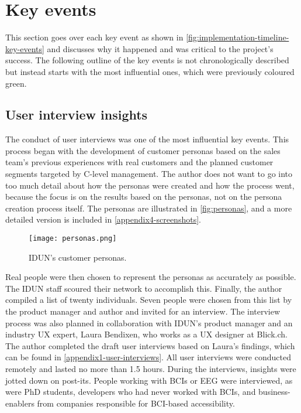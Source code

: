 \section{Key events}
\label{chapter4-key-events}

This section goes over each key event as shown in \autoref{fig:implementation-timeline-key-events} and discusses why it happened and was critical to the project's success. The following outline of the key events is not chronologically described but instead starts with the most influential ones, which were previously coloured green.

\subsection{User interview insights}
\label{chapter4-user-interview-insights}

The conduct of user interviews was one of the most influential key events. This process began with the development of customer personas based on the sales team's previous experiences with real customers and the planned customer segments targeted by C-level management. The author does not want to go into too much detail about how the personas were created and how the process went, because the focus is on the results based on the personas, not on the persona creation process itself. The personas are illustrated in \autoref{fig:personas}, and a more detailed version is included in \autoref{appendix4-screenshots}.

\begin{figure}[!ht]
  \centering
  \texttt{[image: personas.png]}
  \caption{IDUN's customer personas.}
  \label{fig:personas}
\end{figure}

Real people were then chosen to represent the personas as accurately as possible. The IDUN staff scoured their network to accomplish this. Finally, the author compiled a list of twenty individuals. Seven people were chosen from this list by the product manager and author and invited for an interview. The interview process was also planned in collaboration with IDUN's product manager and an industry UX expert, Laura Bendixen, who works as a UX designer at Blick.ch. The author completed the draft user interviews based on Laura's findings, which can be found in \autoref{appendix1-user-interviews}. All user interviews were conducted remotely and lasted no more than 1.5 hours. During the interviews, insights were jotted down on post-its. People working with BCIs or EEG were interviewed, as were PhD students, developers who had never worked with BCIs, and business-enablers from companies responsible for BCI-based accessibility.

